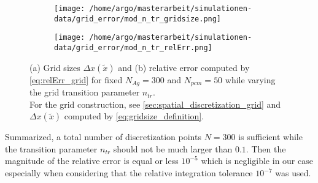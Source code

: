 \documentclass{scrartcl}[12pt, halfparskip]
\numberwithin{equation}{section}
\numberwithin{figure}{section}
\numberwithin{table}{section}
\begin{document}
\begin{figure}[H]
	\begin{subfigure}{0.49\textwidth}
		\texttt{[image: /home/argo/masterarbeit/simulationen-data/grid\_error/mod\_n\_tr\_gridsize.png]}
		\caption{}
		\label{fig:gridsize_mod_n_tr}
	\end{subfigure}
	\begin{subfigure}{0.49\textwidth}
		\texttt{[image: /home/argo/masterarbeit/simulationen-data/grid\_error/mod\_n\_tr\_relErr.png]}
		\caption{}
		\label{fig:grid_relErr_mod_n_tr}
	\end{subfigure}
	\caption{(a) Grid sizes $\Delta x(\tilde{x})$ and (b) relative error computed by \cref{eq:relErr_grid} for fixed $N_{Ag}=300$ and $N_{pcm}=50$ while varying the grid transition parameter $n_{tr}$. \\
	For the grid construction, see \cref{sec:spatial_discretization_grid} and $\Delta x(\tilde{x})$ computed by \cref{eq:gridsize_definition}.}
	\label{fig:grid_mod_n_tr}
\end{figure}

Summarized, a total number of discretization points $N=300$ is sufficient while the transition parameter $n_{tr}$ should not be much larger than $0.1$. Then the magnitude of the relative error is equal or less $10^{-5}$ which is negligible in our case especially when considering that the relative integration tolerance $10^{-7}$ was used.
\end{document}
